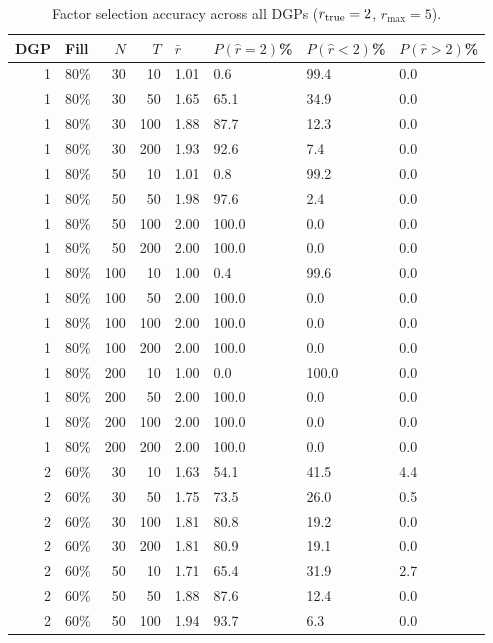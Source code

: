 \begin{table}[ht]
\centering
\caption{Factor selection accuracy across all DGPs ($r_{\rm true} = 2$, $r_{\max} = 5$).} 
\label{tab:mc_factor_sel}
\begin{tabular}{rlrrllll}
  \hline
DGP & Fill & $N$ & $T$ & $\bar r$ & $P(\hat r=2)$\% & $P(\hat r<2)$\% & $P(\hat r>2)$\% \\ 
  \hline
1 & 80\% & 30 & 10 & 1.01 & 0.6 & 99.4 & 0.0 \\ 
  1 & 80\% & 30 & 50 & 1.65 & 65.1 & 34.9 & 0.0 \\ 
  1 & 80\% & 30 & 100 & 1.88 & 87.7 & 12.3 & 0.0 \\ 
  1 & 80\% & 30 & 200 & 1.93 & 92.6 & 7.4 & 0.0 \\ 
  1 & 80\% & 50 & 10 & 1.01 & 0.8 & 99.2 & 0.0 \\ 
  1 & 80\% & 50 & 50 & 1.98 & 97.6 & 2.4 & 0.0 \\ 
  1 & 80\% & 50 & 100 & 2.00 & 100.0 & 0.0 & 0.0 \\ 
  1 & 80\% & 50 & 200 & 2.00 & 100.0 & 0.0 & 0.0 \\ 
  1 & 80\% & 100 & 10 & 1.00 & 0.4 & 99.6 & 0.0 \\ 
  1 & 80\% & 100 & 50 & 2.00 & 100.0 & 0.0 & 0.0 \\ 
  1 & 80\% & 100 & 100 & 2.00 & 100.0 & 0.0 & 0.0 \\ 
  1 & 80\% & 100 & 200 & 2.00 & 100.0 & 0.0 & 0.0 \\ 
  1 & 80\% & 200 & 10 & 1.00 & 0.0 & 100.0 & 0.0 \\ 
  1 & 80\% & 200 & 50 & 2.00 & 100.0 & 0.0 & 0.0 \\ 
  1 & 80\% & 200 & 100 & 2.00 & 100.0 & 0.0 & 0.0 \\ 
  1 & 80\% & 200 & 200 & 2.00 & 100.0 & 0.0 & 0.0 \\ 
  2 & 60\% & 30 & 10 & 1.63 & 54.1 & 41.5 & 4.4 \\ 
  2 & 60\% & 30 & 50 & 1.75 & 73.5 & 26.0 & 0.5 \\ 
  2 & 60\% & 30 & 100 & 1.81 & 80.8 & 19.2 & 0.0 \\ 
  2 & 60\% & 30 & 200 & 1.81 & 80.9 & 19.1 & 0.0 \\ 
  2 & 60\% & 50 & 10 & 1.71 & 65.4 & 31.9 & 2.7 \\ 
  2 & 60\% & 50 & 50 & 1.88 & 87.6 & 12.4 & 0.0 \\ 
  2 & 60\% & 50 & 100 & 1.94 & 93.7 & 6.3 & 0.0 \\ 

\end{tabular}
\end{table}
